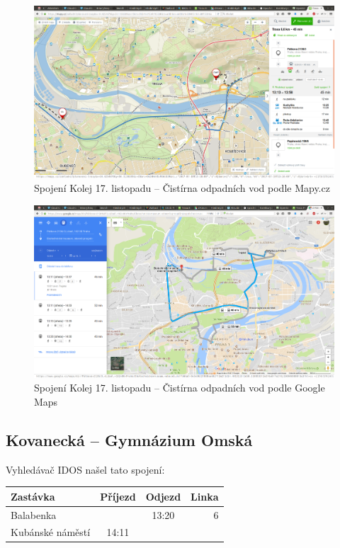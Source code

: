\begin{figure}[h]
  \centering
    \includegraphics[width=\textwidth]{../img/kolej-bubenec-seznam.png}
  \caption{Spojení Kolej 17. listopadu -- Čistírna odpadních vod podle Mapy.cz}
  \label{fig:kolej-bubenec-seznam}
\end{figure}
\begin{figure}[h]
  \centering
    \includegraphics[width=\textwidth]{../img/kolej-bubenec-google.png}
  \caption{Spojení Kolej 17. listopadu -- Čistírna odpadních vod podle Google
  Maps}
  \label{fig:kolej-bubenec-google}
\end{figure}

\subsection{Kovanecká -- Gymnázium Omská}
Vyhledávač IDOS našel tato spojení:

\begin{tabular}{|l|c|c|r|}\hline
{\bf Zastávka}&{\bf Příjezd}&{\bf Odjezd}&{\bf Linka}\\\hline
Balabenka&&13:20&6\\\hline
Kubánské náměstí&14:11&&\\\hline
\end{tabular} 

